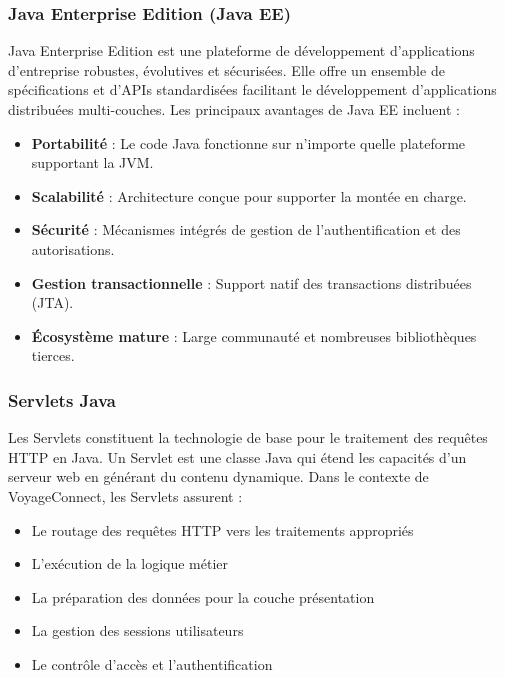 \documentclass[12pt,a4paper]{report}
\begin{document}
\subsubsection{Java Enterprise Edition (Java EE)}

Java Enterprise Edition est une plateforme de développement d'applications d'entreprise robustes, évolutives et sécurisées. Elle offre un ensemble de spécifications et d'APIs standardisées facilitant le développement d'applications distribuées multi-couches. Les principaux avantages de Java EE incluent :

\begin{itemize}
    \item \textbf{Portabilité} : Le code Java fonctionne sur n'importe quelle plateforme supportant la JVM.
    \item \textbf{Scalabilité} : Architecture conçue pour supporter la montée en charge.
    \item \textbf{Sécurité} : Mécanismes intégrés de gestion de l'authentification et des autorisations.
    \item \textbf{Gestion transactionnelle} : Support natif des transactions distribuées (JTA).
    \item \textbf{Écosystème mature} : Large communauté et nombreuses bibliothèques tierces.
\end{itemize}

\subsubsection{Servlets Java}

Les Servlets constituent la technologie de base pour le traitement des requêtes HTTP en Java. Un Servlet est une classe Java qui étend les capacités d'un serveur web en générant du contenu dynamique. Dans le contexte de VoyageConnect, les Servlets assurent :

\begin{itemize}
    \item Le routage des requêtes HTTP vers les traitements appropriés
    \item L'exécution de la logique métier
    \item La préparation des données pour la couche présentation
    \item La gestion des sessions utilisateurs
    \item Le contrôle d'accès et l'authentification
\end{itemize}
\end{document}
